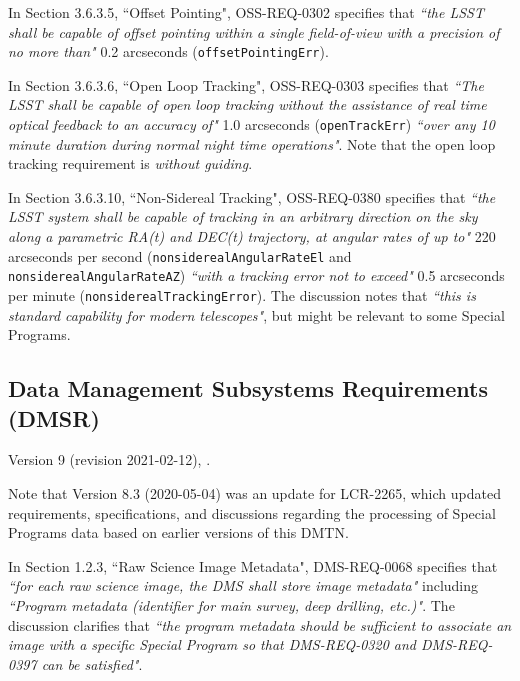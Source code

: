 In Section 3.6.3.5, ``Offset Pointing", OSS-REQ-0302 specifies that {\it ``the LSST shall be capable of 
offset pointing within a single field-of-view with a precision of no more than"} 0.2 arcseconds 
({\tt offsetPointingErr}).

In Section 3.6.3.6, ``Open Loop Tracking", OSS-REQ-0303 specifies that {\it ``The LSST shall be 
capable of open loop tracking without the assistance of real time optical feedback to an accuracy of"} 1.0 arcseconds 
({\tt openTrackErr}) {\it ``over any 10 minute duration during normal night time operations"}.
Note that the open loop tracking requirement is \emph{without guiding}.

In Section 3.6.3.10, ``Non-Sidereal Tracking", OSS-REQ-0380 specifies that {\it ``the LSST system shall 
be capable of tracking in an arbitrary direction on the sky along a parametric RA(t) and DEC(t) trajectory, at 
angular rates of up to"} 220 arcseconds per second ({\tt nonsiderealAngularRateEl} 
and {\tt nonsiderealAngularRateAZ}) {\it ``with a tracking error not to exceed"} 
0.5 arcseconds per minute ({\tt nonsiderealTrackingError}).
The discussion notes that {\it ``this is standard capability for modern telescopes"}, but might be relevant to some 
Special Programs.


\subsection{Data Management Subsystems Requirements (DMSR)}

Version 9 (revision 2021-02-12), . 

Note that Version 8.3 (2020-05-04) was an update for LCR-2265, which updated requirements, specifications, and 
discussions regarding the processing of Special Programs data based on earlier versions of this DMTN.

In Section 1.2.3, ``Raw Science Image Metadata", DMS-REQ-0068 specifies that {\it ``for each raw 
science image, the DMS shall store image metadata"} including {\it ``Program metadata (identifier for main survey, 
deep drilling, etc.)"}.
The discussion clarifies that {\it ``the program metadata should be sufficient to associate an image with a specific 
Special Program so that DMS-REQ-0320 and DMS-REQ-0397 can be satisfied"}.

